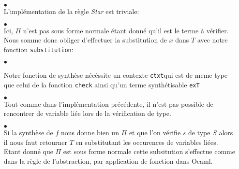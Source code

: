 \documentclass {article}
\newcommand{\codefrom}[3]
           {}
\theoremstyle{definition}
\theoremstyle{remark}
\newcommand{\fun}[1]{\lstinline!#1!}
\begin{document}
\begin{itemize}
         
\item[$\bullet$] \\    

  L'implémentation de la règle \emph{Star} est triviale:
  
  \codefrom{dependent}{lambda}{check_star}

    
\item[$\bullet$] \\    
  
  Ici,  $\Pi$ n'est pas sous forme normale étant donné qu'il est le terme
  à vérifier. Nous somme donc obliger d'effectuer la substitution de $x$ dans $T$
  avec notre fonction \fun{substitution}:
  
\codefrom{dependent}{lambda}{check_pi}

\item[$\bullet$] 

Notre fonction de synthèse nécéssite un contexte \fun{ctxt}qui est de meme type que celui de la fonction
\fun{check} ainsi qu'un terme synthétisable \fun{exT}

    \codefrom{dependent}{lambda}{synth_head}

\item[$\bullet$] \\    

  Tout comme dans l'implémentation précédente, il n'est pas possible de rencontrer de variable 
  liée lors de la vérification de type. 

  \codefrom{dependent}{lambda}{synth_var}


\item[$\bullet$] \\    

  Si la synthèse de $f$ nous donne bien un $\Pi$ et que l'on vérifie $s$ de type
  $S$ alors il nous faut retourner $T$ en substitutant les occurences de variables liées.  
  Etant donné que $\Pi$ est sous forme normale cette subsitution s'effectue
  comme dans la règle de l'abstraction, par application de fonction dans Ocaml.
  
  \codefrom{dependent}{lambda}{synth_app}



\end{itemize}
\end{document}
